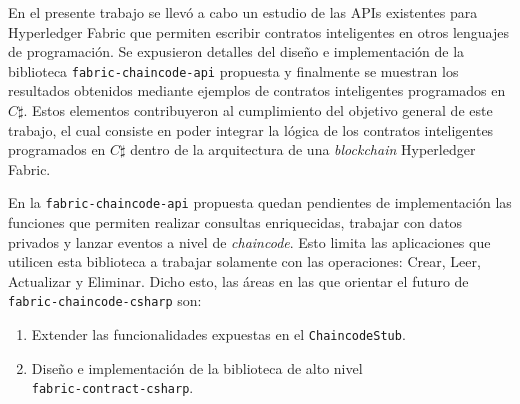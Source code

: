 \begin{conclusions}

En el presente trabajo se llevó a cabo un estudio de las APIs existentes para Hyperledger Fabric que permiten escribir contratos inteligentes en otros lenguajes de programación. Se expusieron detalles del diseño e implementación de la biblioteca \texttt{fabric-chaincode-api} propuesta y finalmente se muestran los resultados obtenidos mediante ejemplos de contratos inteligentes programados en $ C \sharp $. Estos elementos contribuyeron al cumplimiento del objetivo general de este trabajo, el cual consiste en poder integrar la lógica de los contratos inteligentes programados en $ C \sharp $ dentro de la arquitectura de una \textit{blockchain} Hyperledger Fabric.

En la \texttt{fabric-chaincode-api} propuesta quedan pendientes de implementación las funciones que permiten realizar consultas enriquecidas, trabajar con datos privados y lanzar eventos a nivel de \textit{chaincode}. Esto limita las aplicaciones que utilicen esta biblioteca a trabajar solamente con las operaciones: Crear, Leer, Actualizar y Eliminar. Dicho esto, las áreas en las que orientar el futuro de \texttt{fabric-chaincode-csharp} son:
    
\begin{enumerate}
\item Extender las funcionalidades expuestas en el \texttt{ChaincodeStub}.
\item Diseño e implementación de la biblioteca de alto nivel\\ \texttt{fabric-contract-csharp}.
\end{enumerate}

\end{conclusions}
